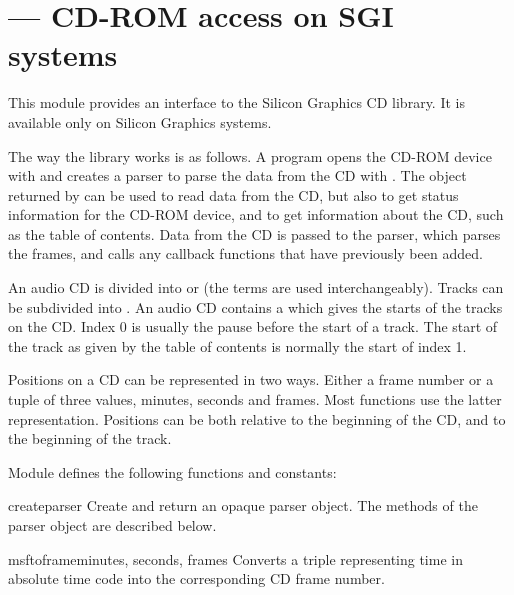 \section{ ---
         CD-ROM access on SGI systems}



This module provides an interface to the Silicon Graphics CD library.
It is available only on Silicon Graphics systems.

The way the library works is as follows.  A program opens the CD-ROM
device with  and creates a parser to parse the data
from the CD with .  The object returned by
 can be used to read data from the CD, but also to get
status information for the CD-ROM device, and to get information about
the CD, such as the table of contents.  Data from the CD is passed to
the parser, which parses the frames, and calls any callback
functions that have previously been added.

An audio CD is divided into  or  (the terms
are used interchangeably).  Tracks can be subdivided into
.  An audio CD contains a  which
gives the starts of the tracks on the CD.  Index 0 is usually the
pause before the start of a track.  The start of the track as given by
the table of contents is normally the start of index 1.

Positions on a CD can be represented in two ways.  Either a frame
number or a tuple of three values, minutes, seconds and frames.  Most
functions use the latter representation.  Positions can be both
relative to the beginning of the CD, and to the beginning of the
track.

Module  defines the following functions and constants:


\begin{funcdesc}{createparser}{}
Create and return an opaque parser object.  The methods of the parser
object are described below.
\end{funcdesc}

\begin{funcdesc}{msftoframe}{minutes, seconds, frames}
Converts a  triple
representing time in absolute time code into the corresponding CD
frame number.
\end{funcdesc}

